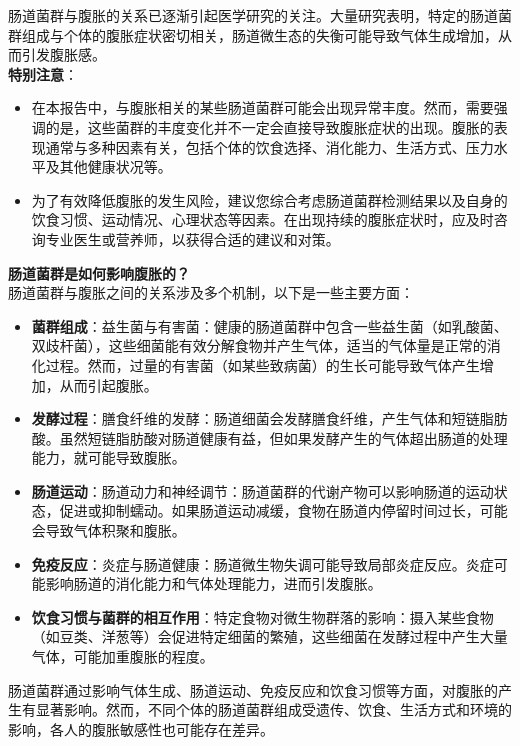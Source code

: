 \documentclass[UTF8]{ctexart}
\begin{document}
\begin{tcolorbox}[
    enhanced,
    colback=customTealBg,
    colframe=customTealBg,
    arc=3mm,
    boxrule=0pt,
    width=\textwidth,
    top=8pt,
    bottom=8pt
]
{\small{\color{customTeal}\faInfoCircle} 肠道菌群与腹胀的关系已逐渐引起医学研究的关注。大量研究表明，特定的肠道菌群组成与个体的腹胀症状密切相关，肠道微生态的失衡可能导致气体生成增加，从而引发腹胀感。\\

{\color{orange}\faExclamationTriangle} \textbf{特别注意}：
\begin{itemize}
    \item 在本报告中，与腹胀相关的某些肠道菌群可能会出现异常丰度。然而，需要强调的是，这些菌群的丰度变化并不一定会直接导致腹胀症状的出现。腹胀的表现通常与多种因素有关，包括个体的饮食选择、消化能力、生活方式、压力水平及其他健康状况等。
    \item 为了有效降低腹胀的发生风险，建议您综合考虑肠道菌群检测结果以及自身的饮食习惯、运动情况、心理状态等因素。在出现持续的腹胀症状时，应及时咨询专业医生或营养师，以获得合适的建议和对策。
\end{itemize}
}
\end{tcolorbox}


\begin{tcolorbox}[
    enhanced,
    colback=lightpurple!10, %
    colframe=lightpurple!10,  %
    arc=3mm,
    boxrule=0.5pt,
    width=\textwidth,
    top=8pt,
    bottom=8pt
]
{\small{\color{lightpurple}\faQuestionCircle}\quad \textbf{肠道菌群是如何影响腹胀的？}\\
{\color{orange!50}\faComments}\quad 肠道菌群与腹胀之间的关系涉及多个机制，以下是一些主要方面：
\begin{itemize}
    \item \textbf{菌群组成}：益生菌与有害菌：健康的肠道菌群中包含一些益生菌（如乳酸菌、双歧杆菌），这些细菌能有效分解食物并产生气体，适当的气体量是正常的消化过程。然而，过量的有害菌（如某些致病菌）的生长可能导致气体产生增加，从而引起腹胀。
    \item \textbf{发酵过程}：膳食纤维的发酵：肠道细菌会发酵膳食纤维，产生气体和短链脂肪酸。虽然短链脂肪酸对肠道健康有益，但如果发酵产生的气体超出肠道的处理能力，就可能导致腹胀。
    \item \textbf{肠道运动}：肠道动力和神经调节：肠道菌群的代谢产物可以影响肠道的运动状态，促进或抑制蠕动。如果肠道运动减缓，食物在肠道内停留时间过长，可能会导致气体积聚和腹胀。
    \item \textbf{免疫反应}：炎症与肠道健康：肠道微生物失调可能导致局部炎症反应。炎症可能影响肠道的消化能力和气体处理能力，进而引发腹胀。
    \item \textbf{饮食习惯与菌群的相互作用}：特定食物对微生物群落的影响：摄入某些食物（如豆类、洋葱等）会促进特定细菌的繁殖，这些细菌在发酵过程中产生大量气体，可能加重腹胀的程度。
\end{itemize}
肠道菌群通过影响气体生成、肠道运动、免疫反应和饮食习惯等方面，对腹胀的产生有显著影响。然而，不同个体的肠道菌群组成受遗传、饮食、生活方式和环境的影响，各人的腹胀敏感性也可能存在差异。
}
\end{tcolorbox}
\end{document}
